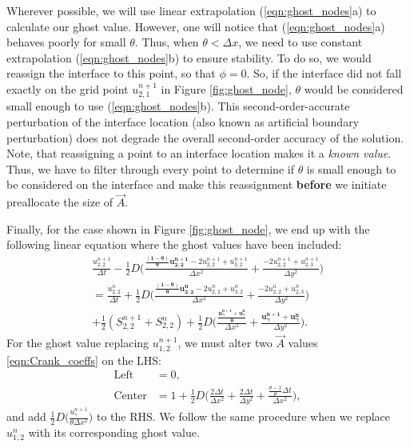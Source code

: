 \documentclass[oneside,12pt,final]{/Applications/TeX/packages/ucthesis-CA2012}
\begin{document}
\begin{mainmatter}
Wherever possible, we will use linear extrapolation (\ref{eqn:ghost_nodes}a) to calculate our ghost value. However, one will notice that (\ref{eqn:ghost_nodes}a) behaves poorly for small $\theta$. Thus, when $\theta < \Delta x$, we need to use constant extrapolation (\ref{eqn:ghost_nodes}b) to ensure stability. To do so, we would reassign the interface to this point, so that $\phi = 0$. So, if the interface did not fall exactly on the grid point $u^{n+1}_{2,1}$ in Figure \ref{fig:ghost_node}, $\theta$ would be considered small enough to use (\ref{eqn:ghost_nodes}b). This second-order-accurate perturbation of the interface location (also known as artificial boundary perturbation) does not degrade the overall second-order accuracy of the solution. Note, that reassigning a point to an interface location makes it a \textit{known value}. Thus, we have to filter through every point to determine if $\theta$ is small enough to be considered on the interface and make this reassignment \textbf{before} we initiate preallocate the size of $\vec{A}$.

Finally, for the case shown in Figure \ref{fig:ghost_node}, we end up with the following linear equation where the ghost values have been included:
\begin{equation}\label{eqn:Crank_dat_ghost}
\begin{aligned}
\frac{u_{2,2}^{n+1}}{\Delta t} - \frac{1}{2}D\bigg(\frac{   \boldsymbol{\frac{(1-\theta)}{\theta} u_{2,2}^{n+1}}
 - 2u_{2,2}^{n+1} + u_{3,2}^{n+1}}{\Delta x^2} + \frac{-2u_{2,2}^{n+1} + u_{2,3}^{n+1}}{\Delta y^2}\bigg)\\
= \frac{u_{2,2}^{n}}{\Delta t} + \frac{1}{2}D\bigg(\frac{   \boldsymbol{\frac{(1-\theta)}{\theta} u_{2,2}^{n}}    - 2u_{2,2}^{n} + u_{3,2}^{n}}{\Delta x^2} + \frac{ - 2u_{2,2}^{n} + {u_{2,3}^{n}}}{\Delta y^2}\bigg)\\
+ \frac{1}{2}(S_{2,2}^{n+1} + S_{2,2}^{n}) + \frac{1}{2} D\bigg(\frac{\boldsymbol{\frac{u_{\gamma}^{n+1}+u_{\gamma}^{n}}{\theta}}}{\Delta x^2} + \frac{\boldsymbol{u_{\gamma}^{n+1}+u_{\gamma}^{n}}}{\Delta y^2}\bigg).
\end{aligned}
\end{equation}
For the ghost value replacing $u_{1,2}^{n+1}$, we must alter two $\vec{A}$ values \eqref{eqn:Crank_coeffs} on the LHS:
\begin{equation}
\begin{aligned}
\text{Left} &= 0,\\
\text{Center} &= 1 + \frac{1}{2}D\bigg(\frac{2 \Delta t}{\Delta x^2} + \frac{2 \Delta t}{\Delta y^2} + \frac{\frac{\theta-1}{\theta}\Delta t}{\Delta x^2}\bigg),
\end{aligned}
\end{equation}
and add $\frac{1}{2} D\bigg( \frac{u_{\gamma}^{n+1}}{\theta \Delta x^2} \bigg)$ to the RHS. We follow the same procedure when we replace $u_{1,2}^n$ with its corresponding ghost value.


\end{mainmatter}
\end{document}
